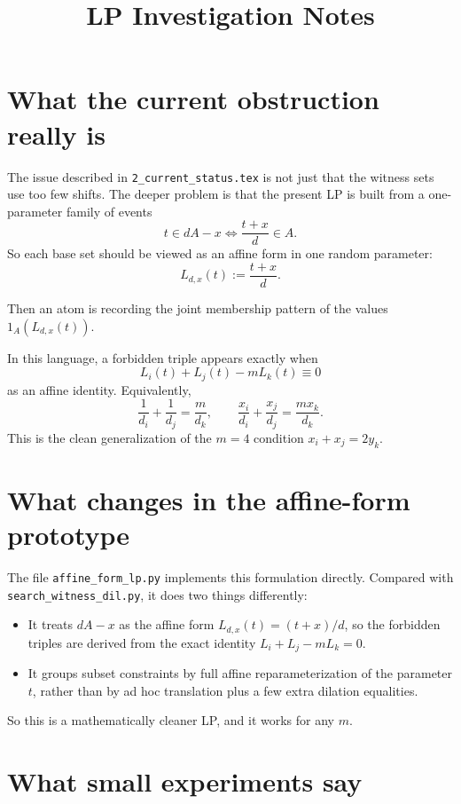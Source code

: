 \documentclass[11pt]{article}
\title{LP Investigation Notes}
\author{}
\date{}
\begin{document}
\maketitle

\section{What the current obstruction really is}

The issue described in \texttt{2\_current\_status.tex} is not just that the witness
sets use too few shifts. The deeper problem is that the present LP is built from a
one-parameter family of events
\[
t \in dA-x \iff \frac{t+x}{d} \in A.
\]
So each base set should be viewed as an affine form in one random parameter:
\[
L_{d,x}(t) := \frac{t+x}{d}.
\]

Then an atom is recording the joint membership pattern of the values
$1_A(L_{d,x}(t))$.

In this language, a forbidden triple appears exactly when
\[
L_i(t)+L_j(t)-mL_k(t)\equiv 0
\]
as an affine identity. Equivalently,
\[
\frac{1}{d_i}+\frac{1}{d_j}=\frac{m}{d_k},
\qquad
\frac{x_i}{d_i}+\frac{x_j}{d_j}=\frac{mx_k}{d_k}.
\]
This is the clean generalization of the $m=4$ condition $x_i+x_j=2y_k$.

\section{What changes in the affine-form prototype}

The file \texttt{affine\_form\_lp.py} implements this formulation directly.
Compared with \texttt{search\_witness\_dil.py}, it does two things differently:

\begin{itemize}
\item It treats $dA-x$ as the affine form $L_{d,x}(t)=(t+x)/d$, so the forbidden
triples are derived from the exact identity $L_i+L_j-mL_k=0$.
\item It groups subset constraints by full affine reparameterization of the
parameter $t$, rather than by ad hoc translation plus a few extra dilation
equalities.
\end{itemize}

So this is a mathematically cleaner LP, and it works for any $m$.

\section{What small experiments say}
\end{document}
